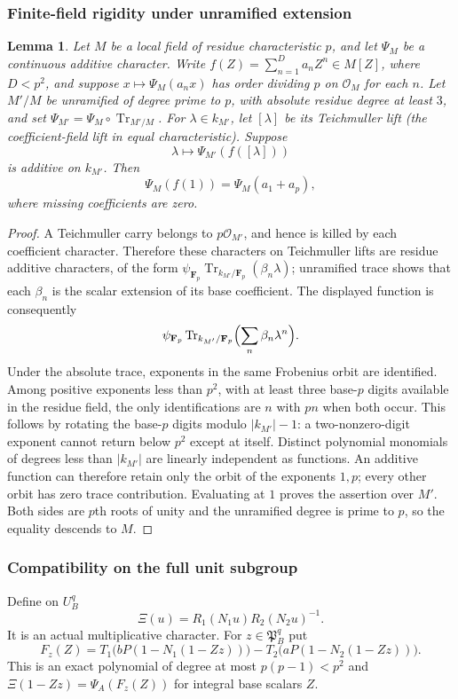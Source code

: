 \documentclass[11pt]{amsart}
\newtheorem{lemma}[theorem]{Lemma}
\theoremstyle{definition}
\theoremstyle{remark}
\newcommand{\Tr}{\operatorname{Tr}}
\newcommand{\OO}{\mathcal O}\newcommand{\pp}{\mathfrak p}\newcommand{\PP}{\mathfrak P}
\begin{document}
\subsubsection*{Finite-field rigidity under unramified extension}
\begin{lemma}\label{O:M:rigidity}
Let $M$ be a local field of residue characteristic $p$, and let $\Psi_M$
be a continuous additive character. Write
$f(Z)=\sum_{n=1}^{D}a_nZ^n\in M[Z]$, where $D<p^2$, and suppose
$x\mapsto\Psi_M(a_nx)$ has order dividing $p$ on $\OO_M$ for each $n$.
Let $M'/M$ be unramified of degree prime to $p$, with absolute residue
degree at least $3$, and set $\Psi_{M'}=\Psi_M\circ\Tr_{M'/M}$.
For $\lambda\in k_{M'}$, let $[\lambda]$ be its Teichmuller lift
(the coefficient-field lift in equal characteristic). Suppose
\[
 \lambda\longmapsto\Psi_{M'}(f([\lambda]))
\]
is additive on $k_{M'}$. Then
\[
 \Psi_M(f(1))=\Psi_M(a_1+a_p),
\]
where missing coefficients are zero.
\end{lemma}
\begin{proof}
A Teichmuller carry belongs to $p\OO_{M'}$, and hence is killed by
each coefficient character. Therefore these characters on Teichmuller
lifts are residue additive characters, of the form
$\psi_{\mathbf F_p}\Tr_{k_{M'}/\mathbf F_p}(\beta_n\lambda)$;
unramified trace shows that each $\beta_n$ is the scalar extension of its
base coefficient. The displayed function is consequently
\[
 \psi_{\mathbf F_p}\Tr_{k_{M'}/\mathbf F_p}
       \Bigl(\sum_n\beta_n\lambda^n\Bigr).
\]
Under the absolute trace, exponents in the same Frobenius orbit are
identified. Among positive exponents less than $p^2$, with at least three
base-$p$ digits available in the residue field, the only identifications
are $n$ with $pn$ when both occur. This follows by rotating the base-$p$
digits modulo $|k_{M'}|-1$: a two-nonzero-digit exponent cannot return below
$p^2$ except at itself. Distinct polynomial monomials of degrees less than
$|k_{M'}|$ are linearly independent as functions. An additive function can
therefore retain only the orbit of the exponents $1,p$; every other orbit
has zero trace contribution. Evaluating at $1$ proves the assertion over
$M'$. Both sides are $p$th roots of unity and the unramified degree is prime
to $p$, so the equality descends to $M$.
\end{proof}

\subsubsection*{Compatibility on the full unit subgroup}
Define on $U_B^q$
\[
 \Xi(u)=R_1(N_1u)R_2(N_2u)^{-1}.
\]
It is an actual multiplicative character. For $z\in\PP_B^q$ put
\begin{equation}\label{O:M:poly}
 F_z(Z)=T_1\bigl(bP(1-N_1(1-Zz))\bigr)
       -T_2\bigl(aP(1-N_2(1-Zz))\bigr).
\end{equation}
This is an exact polynomial of degree at most $p(p-1)<p^2$ and
$\Xi(1-Zz)=\Psi_A(F_z(Z))$ for integral base scalars $Z$.
\end{document}
